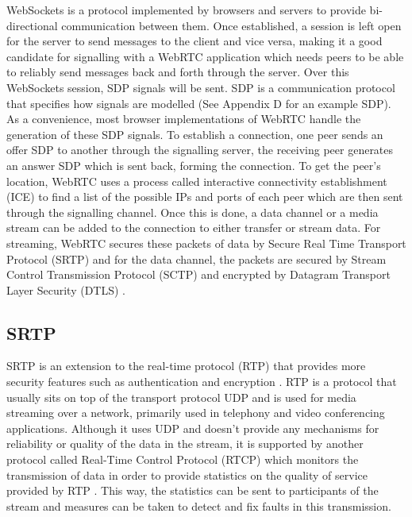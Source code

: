 \documentclass[]{report}
\begin{document}
	WebSockets is a protocol implemented by browsers and servers to provide bi-directional communication between them\cite{WebSockets}. Once established, a session is left open for the server to send messages to the client and vice versa, making it a good candidate for signalling with a WebRTC application which needs peers to be able to reliably send messages back and forth through the server. Over this WebSockets session, SDP signals will be sent. SDP is a communication protocol that specifies how signals are modelled \cite{SDP Over WebSockets} (See Appendix D for an example SDP). As a convenience, most browser implementations of WebRTC handle the generation of these SDP signals. To establish a connection, one peer sends an offer SDP to another through the signalling server, the receiving peer generates an answer SDP which is sent back, forming the connection. To get the peer's location, WebRTC uses a process called interactive connectivity establishment (ICE) to find a list of the possible IPs and ports of each peer which are then sent through the signalling channel. Once this is done, a data channel or a media stream can be added to the connection to either transfer or stream data. For streaming, WebRTC secures these packets of data by Secure Real Time Transport Protocol (SRTP) and for the data channel, the packets are secured by Stream Control Transmission Protocol (SCTP) and encrypted by Datagram Transport Layer Security (DTLS) \cite{WebRTC Data Channel Establishment Protocol}. 
	
	  \subsection{SRTP}
	  SRTP is an extension to the real-time protocol (RTP) that provides more security features such as authentication and encryption \cite{SRTP}. RTP is a protocol that usually sits on top of the transport protocol UDP and is used for media streaming over a network, primarily used in telephony and video conferencing applications. Although it uses UDP and doesn't provide any mechanisms for reliability or quality of the data in the stream, it is supported by another protocol called Real-Time Control Protocol (RTCP) which monitors the transmission of data in order to provide statistics on the quality of service provided by RTP \cite{RTP}. This way, the statistics can be sent to participants of the stream and measures can be taken to detect and fix faults in this transmission.
	  
\end{document}
